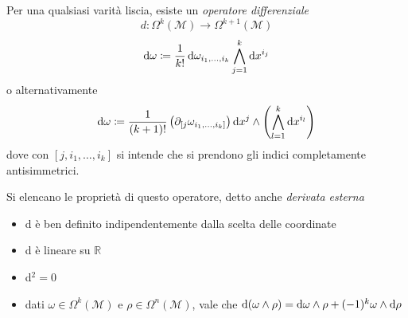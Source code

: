 Per una qualsiasi varità liscia, esiste un \emph{operatore differenziale}
\[
    d : \Omega^k (\mathcal{M}) \longrightarrow \Omega^{k+1}(\mathcal{M})
\]
\begin{equation}
    \odif{\omega} \coloneqq \frac{1}{k!}\odif{\omega_{i_1, \dots, i_k}} \bigwedge_{j=1}^k \odif{x^{i_j}}
\end{equation}
o alternativamente
\begin{equation}
    \odif{\omega} \coloneqq \frac{1}{(k+1)!} \left( \partial_{[j} \omega_{i_1, \dots, i_k]} \right) \odif{x^j} \wedge \left(\bigwedge_{l=1}^k \odif{x^{i_l}}\right)
\end{equation}
dove con $[j, i_1, \dots, i_k]$ si intende che si prendono gli indici completamente antisimmetrici.
\begin{property} Si elencano le proprietà di questo operatore, detto anche \emph{derivata esterna}
    \begin{itemize}
        \item d è ben definito indipendentemente dalla scelta delle coordinate
        \item d è lineare su $\mathbb{R}$
        \item d$^2 = 0$
        \item dati $\omega \in \Omega^k(\mathcal{M})$ e $\rho \in \Omega^n(\mathcal{M})$, vale che $\odif{(\omega \wedge \rho)} = \odif{\omega} \wedge \rho + (-1)^k \omega \wedge \odif{\rho}$
    \end{itemize}
\end{property}